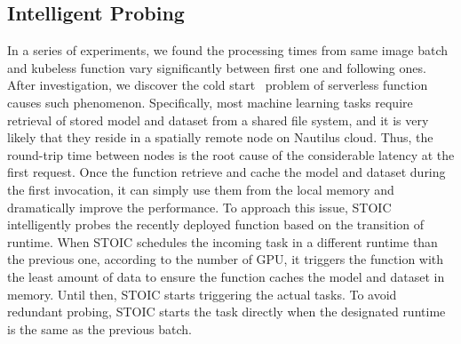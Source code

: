  \subsection{Intelligent Probing}
 In a series of experiments, we found the processing times from same image batch and kubeless function vary significantly between first one and following ones. After investigation, we discover the cold start~\cite{ref:coldstart} problem of serverless function causes such phenomenon. Specifically, most machine learning tasks require retrieval of stored model and dataset from a shared file system, and it is very likely that they reside in a spatially remote node on Nautilus cloud. Thus, the round-trip time between nodes is the root cause of the considerable latency at the first request. Once the function retrieve and cache the model and dataset during the first invocation, it can simply use them from the local memory and dramatically improve the performance. To approach this issue, STOIC intelligently probes the recently deployed function based on the transition of runtime. When STOIC schedules the incoming task in a different runtime than the previous one, according to the number of GPU, it triggers the function with the least amount of data to ensure the function caches the model and dataset in memory. Until then, STOIC starts triggering the actual tasks. To avoid redundant probing, STOIC starts the task directly when the designated runtime is the same as the previous batch.